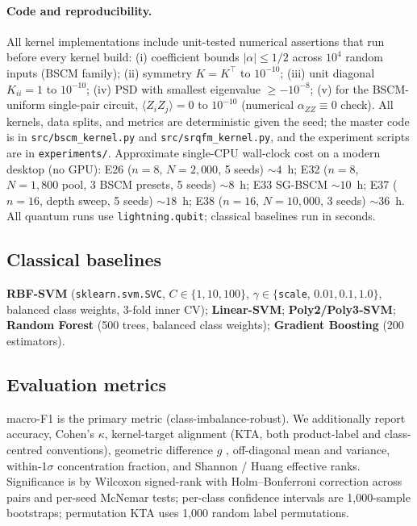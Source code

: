 \documentclass[pdflatex,sn-mathphys-num]{sn-jnl}
\theoremstyle{thmstyleone}
\theoremstyle{thmstyletwo}
\theoremstyle{thmstylethree}
\begin{document}
\paragraph{Code and reproducibility.}
All kernel implementations include unit-tested numerical assertions
that run before every kernel build:
(i) coefficient bounds $|\alpha|\le 1/2$ across $10^4$ random inputs
(BSCM family);
(ii) symmetry $K=K^\top$ to $10^{-10}$;
(iii) unit diagonal $K_{ii}=1$ to $10^{-10}$;
(iv) PSD with smallest eigenvalue $\ge -10^{-8}$;
(v) for the BSCM-uniform single-pair circuit,
$\langle Z_iZ_j\rangle = 0$ to $10^{-10}$ (numerical
$\alpha_{ZZ}\equiv 0$ check). All kernels, data splits, and metrics
are deterministic given the seed; the master code is in
\texttt{src/bscm\_kernel.py} and \texttt{src/srqfm\_kernel.py}, and
the experiment scripts are in \texttt{experiments/}.
Approximate single-CPU wall-clock cost on a modern desktop (no GPU):
E26 ($n=8$, $N=2{,}000$, 5 seeds) $\sim\!4$~h; E32 ($n=8$,
$N=1{,}800$ pool, 3 BSCM presets, 5 seeds) $\sim\!8$~h; E33 SG-BSCM
$\sim\!10$~h; E37 ($n=16$, depth sweep, 5 seeds) $\sim\!18$~h;
E38 ($n=16$, $N=10{,}000$, 3 seeds) $\sim\!36$~h. All quantum
runs use \texttt{lightning.qubit}; classical baselines run in seconds.

\subsection{Classical baselines}
\textbf{RBF-SVM} (\texttt{sklearn.svm.SVC}, $C\in \{1,10,100\}$,
$\gamma\in \{$\texttt{scale}, $0.01, 0.1, 1.0\}$, balanced class
weights, 3-fold inner CV); \textbf{Linear-SVM}; \textbf{Poly2/Poly3-SVM};
\textbf{Random Forest} (500 trees, balanced class weights);
\textbf{Gradient Boosting} (200 estimators).

\subsection{Evaluation metrics}
macro-F1 is the primary metric (class-imbalance-robust).
We additionally report accuracy, Cohen's $\kappa$, kernel-target
alignment (KTA, both product-label and class-centred conventions),
geometric difference $g$ \cite{huang2021}, off-diagonal mean and
variance, within-1$\sigma$ concentration fraction, and Shannon /
Huang effective ranks. Significance is by Wilcoxon signed-rank with
Holm--Bonferroni correction across pairs and per-seed McNemar tests;
per-class confidence intervals are 1{,}000-sample bootstraps;
permutation KTA uses 1{,}000 random label permutations.
\end{document}
